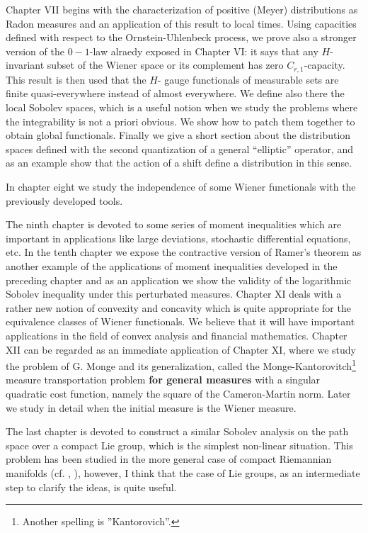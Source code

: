 \documentclass[12pt,a4paper]{book}
\begin{document}
Chapter VII begins with the characterization of positive (Meyer)  distributions
as Radon measures and an application of this result to local
times. Using capacities defined with respect to the Ornstein-Uhlenbeck
process, we prove also a stronger version of
the $0-1$-law alraedy exposed in Chapter VI: it  says that any
$H$-invariant subset of the Wiener space or its complement has zero 
$C_{r,1}$-capacity. This result is then used that the $H$- gauge
functionals of measurable sets are finite quasi-everywhere instead of
almost everywhere. We define also there the local Sobolev spaces,
which is  a useful  notion when we study the problems where the
integrability is not a priori obvious. We show how to patch them
together to obtain global functionals. Finally we give a short section
about the distribution spaces defined with the second quantization of
a general ``elliptic'' operator, and as an example show that the
action of a shift define a distribution in this sense.

In chapter eight  we study the independence of some
Wiener functionals with the previously developed tools. 

The ninth
chapter  is devoted to some series of moment inequalities which
are important in   applications like large
 deviations, stochastic differential equations, etc. In  the tenth
 chapter we expose the contractive version of  Ramer's theorem as
 another example of the applications of moment inequalities developed
 in the preceding chapter and as an application we show  the validity
 of the logarithmic Sobolev inequality under this perturbated
 measures. Chapter XI deals with a rather new notion of convexity and
concavity which is quite appropriate for the equivalence classes of
Wiener functionals.  We believe that it will have important
applications in the field of convex analysis and financial
mathematics.
Chapter XII can be regarded as  an immediate application of Chapter
XI, where we study the problem of G. Monge and its generalization,
called the Monge-Kantorovitch\footnote{Another spelling is
  ''Kantorovich''.} measure transportation problem {\bf {for general
measures}} with a singular quadratic cost function, namely the square of
the Cameron-Martin norm. Later we study in detail when the initial
measure is the Wiener measure.


 The last chapter is devoted to construct a similar Sobolev
 analysis on the path space over a compact Lie group, which is the
 simplest non-linear situation. This problem has been studied in the
 more general case of compact Riemannian manifolds
 (cf. \cite{Mall-1}, \cite{M-M1}), however, I think that the case of Lie
 groups, as an intermediate step to clarify the ideas, is quite useful.
\end{document}
